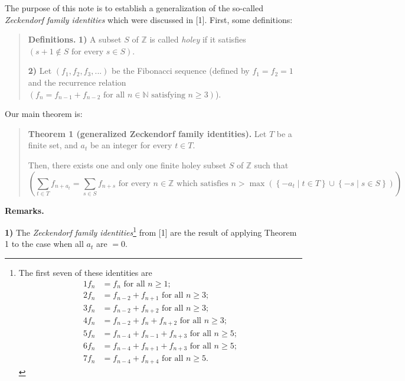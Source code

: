 \documentclass[12pt,final,notitlepage,onecolumn]{article}%
\begin{document}
\bigskip

The purpose of this note is to establish a generalization of the so-called
\textit{Zeckendorf family identities} which were discussed in [1]. First, some definitions:

\begin{quote}
\textbf{Definitions.} \textbf{1)} A subset $S$ of $\mathbb{Z}$ is called
\textit{holey} if it satisfies $\left(  s+1\notin S\text{ for every }s\in
S\right)  $.

\textbf{2)} Let $\left(  f_{1},f_{2},f_{3},...\right)  $ be the Fibonacci
sequence (defined by $f_{1}=f_{2}=1$ and the recurrence relation $\left(
f_{n}=f_{n-1}+f_{n-2}\text{ for all }n\in\mathbb{N}\text{ satisfying }%
n\geq3\right)  $).
\end{quote}

Our main theorem is:

\begin{quote}
\textbf{Theorem 1 (generalized Zeckendorf family identities).} Let $T$ be a
finite set, and $a_{t}$ be an integer for every $t\in T$.

Then, there exists one and only one finite holey subset $S$ of $\mathbb{Z}$
such that
\[
\left(  \sum\limits_{t\in T}f_{n+a_{t}}=\sum\limits_{s\in S}f_{n+s}\text{ for
every }n\in\mathbb{Z}\text{ which satisfies }n>\max\left(  \left\{  -a_{t}\mid
t\in T\right\}  \cup\left\{  -s\mid s\in S\right\}  \right)  \right)  .
\]



\end{quote}

\textbf{Remarks.}

\textbf{1)} The \textit{Zeckendorf family identities}\footnote{The first seven
of these identities are%
\begin{align*}
1f_{n} &  =f_{n}\text{ for all }n\geq1;\\
2f_{n} &  =f_{n-2}+f_{n+1}\text{ for all }n\geq3;\\
3f_{n} &  =f_{n-2}+f_{n+2}\text{ for all }n\geq3;\\
4f_{n} &  =f_{n-2}+f_{n}+f_{n+2}\text{ for all }n\geq3;\\
5f_{n} &  =f_{n-4}+f_{n-1}+f_{n+3}\text{ for all }n\geq5;\\
6f_{n} &  =f_{n-4}+f_{n+1}+f_{n+3}\text{ for all }n\geq5;\\
7f_{n} &  =f_{n-4}+f_{n+4}\text{ for all }n\geq5.
\end{align*}
} from [1] are the result of applying Theorem 1 to the case when all $a_{t}$
are $=0$.
\end{document}
